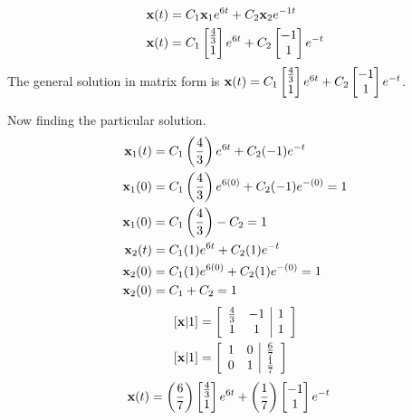 \documentclass{article}
\begin{document}
\begin{align*}
	\vect{x}(t) & = C_1 \vect{x}_1 e^{6t} + C_2 \vect{x}_2 e^{-1t} \\
	\vect{x}(t) & =
		C_1 \begin{bmatrix} \frac{4}{3} \\ 1 \end{bmatrix} e^{6t}
		+ C_2 \begin{bmatrix} -1 \\ 1 \end{bmatrix} e^{-t}
\end{align*}
The general solution in matrix form is $ \vect{x}(t) = C_1 \begin{bmatrix} \frac{4}{3} \\ 1 \end{bmatrix} e^{6t} + C_2 \begin{bmatrix} -1 \\ 1 \end{bmatrix} e^{-t} $.

\hr

Now finding the particular solution.
\begin{align*}
	\vect{x}_1(t) & = C_1 \left( \frac{4}{3} \right) e^{6t} + C_2 (-1) e^{-t} \\
	\vect{x}_1(0) & = C_1 \left( \frac{4}{3} \right) e^{6(0)} + C_2 (-1) e^{-(0)} = 1 \\
	\vect{x}_1(0) & = C_1 \left( \frac{4}{3} \right) - C_2 = 1 \\
	\vect{x}_2(t) & = C_1 (1) e^{6t} + C_2 (1) e^{-t} \\
	\vect{x}_2(0) & = C_1 (1) e^{6(0)} + C_2 (1) e^{-(0)} = 1 \\
	\vect{x}_2(0) & = C_1 + C_2 = 1
\end{align*}
\begin{align*}
	\left[ \vect{x} | 1 \right] & =
		\left[ \begin{array}{ c c | c }
			\frac{4}{3} & -1 & 1 \\
			1 & 1 & 1
		\end{array} \right] \\
	\left[ \vect{x} | 1 \right] & =
		\left[ \begin{array}{ c c | c }
			1 & 0 & \frac{6}{7} \\
			0 & 1 & \frac{1}{7}
		\end{array} \right]
\end{align*}
\begin{align*}
	\vect{x}(t) & = \left( \frac{6}{7} \right) \begin{bmatrix} \frac{4}{3} \\ 1 \end{bmatrix} e^{6t} + \left( \frac{1}{7} \right) \begin{bmatrix} -1 \\ 1 \end{bmatrix} e^{-t}
\end{align*}
\end{document}
